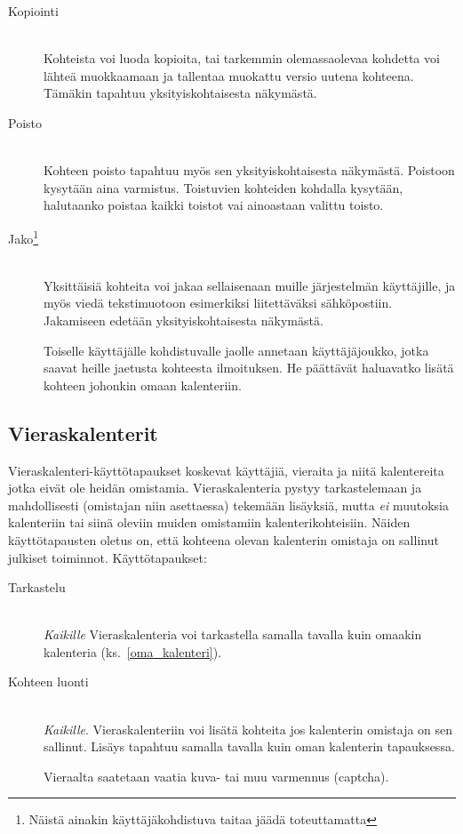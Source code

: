 \documentclass[a4paper,12pt]{report}
\begin{document}
\begin{description}
   \item[Kopiointi]\hfill\\
      Kohteista voi luoda kopioita, tai tarkemmin olemassa\-olevaa kohdetta voi
      läh\-teä muokkaamaan ja tallentaa muokattu versio uutena kohteena. Tämäkin
      tapahtuu yksityiskohtaisesta näkymästä.

   \item[Poisto]\hfill\\
      Kohteen poisto tapahtuu myös sen yksityiskohtaisesta näkymästä.  Poistoon
      kysytään aina varmistus.  Toistuvien kohteiden kohdalla kysytään,
      halutaanko poistaa kaikki toistot vai ainoastaan valittu toisto.

   \item[Jako\footnote{Näistä ainakin käyttäjäkohdistuva taitaa jäädä
      toteuttamatta}]\hfill\\
      Yksittäisiä kohteita voi jakaa sellaisenaan muille järjestelmän
      käyttäjille, ja myös viedä tekstimuotoon esimerkiksi liitettäväksi
      sähköpostiin.  Jakamiseen edetään yksityiskohtaisesta näkymästä. 

      Toiselle käyttäjälle kohdistuvalle jaolle annetaan käyttäjäjoukko, jotka
      saavat heille jaetusta kohteesta ilmoituksen.  He päättävät haluavatko
      lisätä kohteen johonkin omaan kalenteriin.
\end{description}

\subsection{Vieraskalenterit}
Vieraskalenteri-käyttötapaukset koskevat käyttäjiä, vieraita ja niitä
kalentereita jotka eivät ole heidän omistamia.  Vieraskalenteria pystyy
tarkastelemaan ja mahdollisesti (omistajan niin asettaessa) tekemään lisäyksiä,
mutta \emph{ei} muutoksia kalenteriin tai siinä oleviin muiden omistamiin
kalenterikohteisiin.  Näiden käyttötapausten oletus on, että kohteena olevan
kalenterin omistaja on sallinut julkiset toiminnot.  Käyttötapaukset:
\begin{description}
   \item[Tarkastelu]\hfill\\
      \textit{Kaikille} Vieraskalenteria voi tarkastella samalla tavalla kuin
      omaakin kalenteria (ks.~\ref{oma_kalenteri}).
   \item[Kohteen luonti]\hfill\\
      \textit{Kaikille}. Vieraskalenteriin voi lisätä kohteita jos kalenterin
      omistaja on sen sallinut.  Lisäys tapahtuu samalla tavalla kuin oman
      kalenterin tapauksessa. 

      Vieraalta saatetaan vaatia kuva- tai muu varmennus (captcha).
\end{description}
\end{document}
